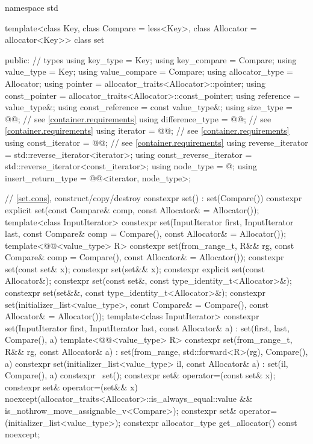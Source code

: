 \begin{codeblock}
namespace std {
  template<class Key, class Compare = less<Key>,
           class Allocator = allocator<Key>>
  class set {
  public:
    // types
    using key_type               = Key;
    using key_compare            = Compare;
    using value_type             = Key;
    using value_compare          = Compare;
    using allocator_type         = Allocator;
    using pointer                = allocator_traits<Allocator>::pointer;
    using const_pointer          = allocator_traits<Allocator>::const_pointer;
    using reference              = value_type&;
    using const_reference        = const value_type&;
    using size_type              = @@; // see \ref{container.requirements}
    using difference_type        = @@; // see \ref{container.requirements}
    using iterator               = @@; // see \ref{container.requirements}
    using const_iterator         = @@; // see \ref{container.requirements}
    using reverse_iterator       = std::reverse_iterator<iterator>;
    using const_reverse_iterator = std::reverse_iterator<const_iterator>;
    using node_type              = @\unspec@;
    using insert_return_type     = @@<iterator, node_type>;

    // \ref{set.cons}, construct/copy/destroy
    constexpr set() : set(Compare()) { }
    constexpr explicit set(const Compare& comp, const Allocator& = Allocator());
    template<class InputIterator>
      constexpr set(InputIterator first, InputIterator last,
                    const Compare& comp = Compare(), const Allocator& = Allocator());
    template<@@<value_type> R>
      constexpr set(from_range_t, R&& rg,
                    const Compare& comp = Compare(), const Allocator& = Allocator());
    constexpr set(const set& x);
    constexpr set(set&& x);
    constexpr explicit set(const Allocator&);
    constexpr set(const set&, const type_identity_t<Allocator>&);
    constexpr set(set&&, const type_identity_t<Allocator>&);
    constexpr set(initializer_list<value_type>,
                  const Compare& = Compare(), const Allocator& = Allocator());
    template<class InputIterator>
      constexpr set(InputIterator first, InputIterator last, const Allocator& a)
        : set(first, last, Compare(), a) { }
    template<@@<value_type> R>
      constexpr set(from_range_t, R&& rg, const Allocator& a)
        : set(from_range, std::forward<R>(rg), Compare(), a) { }
    constexpr set(initializer_list<value_type> il, const Allocator& a)
      : set(il, Compare(), a) { }
    constexpr ~set();
    constexpr set& operator=(const set& x);
    constexpr set& operator=(set&& x)
      noexcept(allocator_traits<Allocator>::is_always_equal::value &&
               is_nothrow_move_assignable_v<Compare>);
    constexpr set& operator=(initializer_list<value_type>);
    constexpr allocator_type get_allocator() const noexcept;

}}
\end{codeblock}
